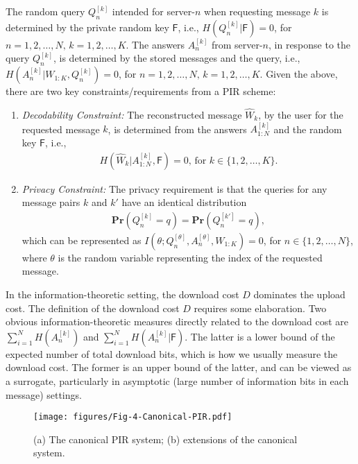 The random query $Q^{[k]}_n$ intended for server-$n$ when requesting message $k$ is determined by the private random key $\mathsf{F}$, i.e.,
$H(Q^{[k]}_n|\mathsf{F})=0$, for $n=1,2,\ldots,N,\, k=1,2,\ldots,K$. The answers $A^{[k]}_n$ from server-$n$, in response to the query $Q^{[k]}_n$, is determined by the stored messages and the query, i.e.,
$H(A^{[k]}_n|W_{1:K},Q^{[k]}_n)=0$,  for $n=1,2,\ldots,N,\,  k= 1,2,\ldots,K$. Given the above, there are two key constraints/requirements from a PIR scheme: 
\begin{enumerate}
\item \textit{Decodability Constraint:} The reconstructed message $\hat{W}_k$, by the user for the requested message $k$, is determined from the answers $A^{[k]}_{1:N}$ and the random key $\mathsf{F}$, i.e., 
\begin{align}
H(\hat{W}_k|A^{[k]}_{1:N},\mathsf{F})=0, \, \text{for } k\in\{1,2,\ldots,K\}.
\end{align}
\item \textit{Privacy Constraint:} The privacy requirement is that the queries for any message pairs $k$ and $k'$ have an identical distribution
\begin{align}
\mathbf{Pr}(Q^{[k]}_n=q)=\mathbf{Pr}(Q^{[k']}_n=q),
\end{align}
which can be represented as $I(\theta;Q^{[\theta]}_n,A^{[\theta]}_n,W_{1:K})=0$, for $n\in \{1, 2, \ldots, N\}$, where $\theta$ is the random variable representing the index of the requested message. 
\end{enumerate}

In the information-theoretic setting, the download cost $D$ dominates the upload cost. The definition of the download cost $D$ requires some elaboration. Two obvious information-theoretic measures directly related to the download cost are $\sum_{i=1}^N H(A^{[k]}_n)$ and $\sum_{i=1}^N H(A^{[k]}_n|\mathsf{F})$. The latter is a lower bound of the expected number of total download bits, which is how we usually measure the download cost. The former is an upper bound of the latter, and can be viewed as a surrogate, particularly in asymptotic (large number of information bits in each message) settings.  

\begin{figure*}[t]
\centering
\vspace{0.2cm}
\texttt{[image: figures/Fig-4-Canonical-PIR.pdf]}
\caption{(a) The canonical PIR system; (b) extensions of the canonical system. \label{fig:PIR_diag} }
\end{figure*}


